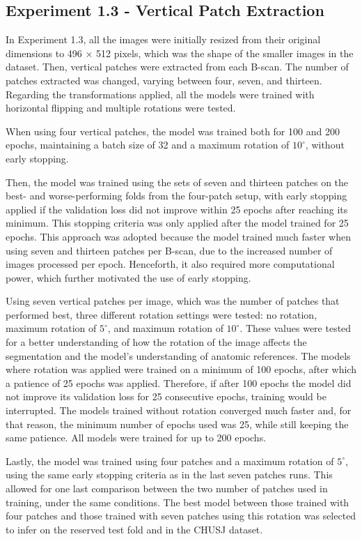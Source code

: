 \subsection{Experiment 1.3 - Vertical Patch Extraction}
In Experiment 1.3, all the images were initially resized from their original dimensions to 496 $\times$ 512 pixels, which was the shape of the smaller images in the dataset. Then, vertical patches were extracted from each B-scan. The number of patches extracted was changed, varying between four, seven, and thirteen. Regarding the transformations applied, all the models were trained with horizontal flipping and multiple rotations were tested.
\par
When using four vertical patches, the model was trained both for 100 and 200 epochs, maintaining a batch size of 32 and a maximum rotation of $10^{\circ}$, without early stopping. 
\par
Then, the model was trained using the sets of seven and thirteen patches on the best- and worse-performing folds from the four-patch setup, with early stopping applied if the validation loss did not improve within 25 epochs after reaching its minimum. This stopping criteria was only applied after the model trained for 25 epochs. This approach was adopted because the model trained much faster when using seven and thirteen patches per B-scan, due to the increased number of images processed per epoch. Henceforth, it also required more computational power, which further motivated the use of early stopping.
\par
Using seven vertical patches per image, which was the number of patches that performed best, three different rotation settings were tested: no rotation, maximum rotation of $5^{\circ}$, and maximum rotation of $10^{\circ}$. These values were tested for a better understanding of how the rotation of the image affects the segmentation and the model's understanding of anatomic references. The models where rotation was applied were trained on a minimum of 100 epochs, after which a patience of 25 epochs was applied. Therefore, if after 100 epochs the model did not improve its validation loss for 25 consecutive epochs, training would be interrupted. The models trained without rotation converged much faster and, for that reason, the minimum number of epochs used was 25, while still keeping the same patience. All models were trained for up to 200 epochs.
\par
Lastly, the model was trained using four patches and a maximum rotation of $5^{\circ}$, using the same early stopping criteria as in the last seven patches runs. This allowed for one last comparison between the two number of patches used in training, under the same conditions. The best model between those trained with four patches and those trained with seven patches using this rotation was selected to infer on the reserved test fold and in the CHUSJ dataset.

